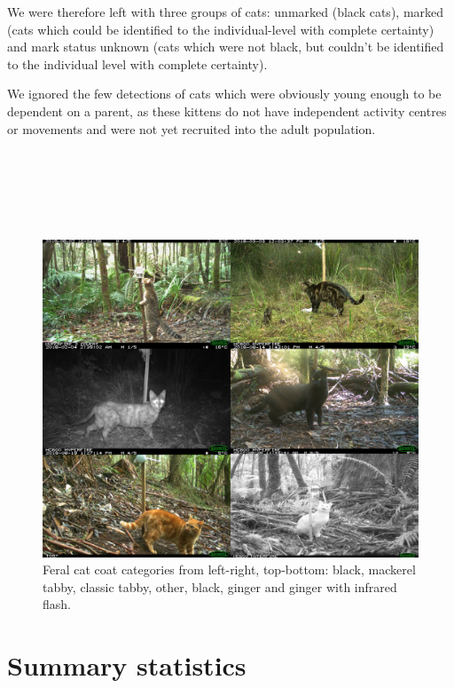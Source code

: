 \documentclass[11pt,a4paper,titlepage,twoside,openright]{style/unimelbthesis}
\begin{document}
\begin{mainmatter}
We were therefore left with three groups of cats: unmarked (black cats), marked (cats which could be identified to the individual-level with complete certainty) and mark status unknown (cats which were not black, but couldn't be identified to the individual level with complete certainty).

We ignored the few detections of cats which were obviously young enough to be dependent on a parent, as these kittens do not have independent activity centres or movements and were not yet recruited into the adult population.

\newpage

\(~\)

\(~\)

\(~\)
\begin{figure}

{\centering \includegraphics[width=1\linewidth]{figure/cat_coats} 

}

\caption{Feral cat coat categories from left-right, top-bottom: black, mackerel tabby, classic tabby, other, black, ginger and ginger with infrared flash.}\label{fig:density-cat-photo}
\end{figure}
\newpage

\hypertarget{summary-statistics}{%
\section{Summary statistics}\label{summary-statistics}}


\end{mainmatter}
\end{document}
